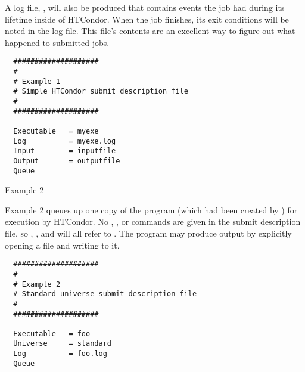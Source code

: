 A log file, , will also be produced that contains events
the job had during its lifetime inside of HTCondor.
When the job finishes, its exit conditions will be noted in the log file.
This file's contents are an excellent way to figure out what
happened to submitted jobs.
\begin{verbatim}
  ####################                                                    
  # 
  # Example 1                                                            
  # Simple HTCondor submit description file                                    
  #                                                                       
  ####################                                                    
                                                                          
  Executable   = myexe                                                    
  Log          = myexe.log                                                    
  Input        = inputfile
  Output       = outputfile
  Queue    
\end{verbatim}

\begin{description}
\item[Example 2]
\end{description}
Example 2 queues up one copy of the program 
(which had been created by )
for execution by HTCondor.
No , , or 
commands are given in the submit description file,
so , , and  will all refer to 
.
The program may produce output by explicitly opening a file and writing to
it.
\begin{verbatim}
  ####################                                                    
  # 
  # Example 2                                                            
  # Standard universe submit description file
  #                                                                       
  ####################                                                    
                                                                          
  Executable   = foo                                                    
  Universe     = standard                                                    
  Log          = foo.log                                                    
  Queue    
\end{verbatim}

